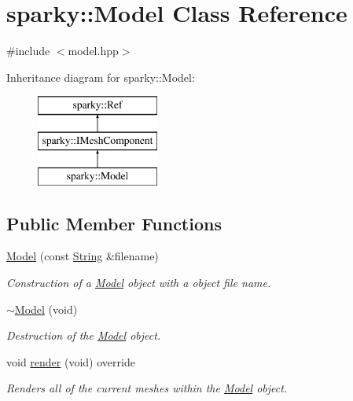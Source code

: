 \hypertarget{classsparky_1_1_model}{}\section{sparky\+:\+:Model Class Reference}
\label{classsparky_1_1_model}


{\ttfamily \#include $<$model.\+hpp$>$}

Inheritance diagram for sparky\+:\+:Model\+:\begin{figure}[H]
\begin{center}
\leavevmode
\includegraphics[height=3.000000cm]{classsparky_1_1_model}
\end{center}
\end{figure}
\subsection*{Public Member Functions}
\begin{DoxyCompactItemize}
\item 
\hyperlink{classsparky_1_1_model_a904d0ff661acc6b5561b66a6390292f2}{Model} (const \hyperlink{classsparky_1_1_string}{String} \&filename)
\begin{DoxyCompactList}\small\item\em Construction of a \hyperlink{classsparky_1_1_model}{Model} object with a object file name. \end{DoxyCompactList}\item 
\hyperlink{classsparky_1_1_model_aa39af5320a4edaaf3ee6faa14096f79e}{$\sim$\+Model} (void)
\begin{DoxyCompactList}\small\item\em Destruction of the \hyperlink{classsparky_1_1_model}{Model} object. \end{DoxyCompactList}\item 
void \hyperlink{classsparky_1_1_model_a0c0610085b029e33351d3d61a76bc92b}{render} (void) override\hypertarget{classsparky_1_1_model_a0c0610085b029e33351d3d61a76bc92b}{}\label{classsparky_1_1_model_a0c0610085b029e33351d3d61a76bc92b}

\begin{DoxyCompactList}\small\item\em Renders all of the current meshes within the \hyperlink{classsparky_1_1_model}{Model} object. \end{DoxyCompactList}\end{DoxyCompactItemize}
